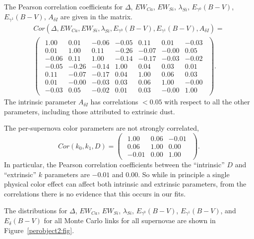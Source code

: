 \documentclass{aastex61}   	%
\begin{document}
The Pearson correlation coefficients for $\Delta$, $EW_{Ca}$, $EW_{Si}$, $\lambda_{Si}$, $E_{\gamma^0}(B-V)$, $E_{\gamma^1}(B-V)$,  $A_{\delta I}$ are given in the matrix.
\begin{multline}
Cor(\Delta, EW_{Ca}, EW_{Si}, \lambda_{Si}, E_{\gamma^0}(B-V), E_{\gamma^1}(B-V),  A_{\delta I}) =\\
\begin{pmatrix}
\begin{array}{rrrrrrr}
1.00 & 0.01 & -0.06 & -0.05 & 0.11 & 0.01 & -0.03 \\
0.01 & 1.00 & 0.11 & -0.26 & -0.07 & -0.00 & 0.05 \\
-0.06 & 0.11 & 1.00 & -0.14 & -0.17 & -0.03 & -0.02 \\
-0.05 & -0.26 & -0.14 & 1.00 & 0.04 & 0.03 & 0.01 \\
0.11 & -0.07 & -0.17 & 0.04 & 1.00 & 0.06 & 0.03 \\
0.01 & -0.00 & -0.03 & 0.03 & 0.06 & 1.00 & -0.00 \\
-0.03 & 0.05 & -0.02 & 0.01 & 0.03 & -0.00 & 1.00
\end{array}
\end{pmatrix}.
\end{multline}
The intrinsic parameter $A_{\delta I}$ has correlations $<0.05$ with respect to all the other parameters, including those attributed
to extrinsic dust.

\color{red}
The per-supernova color parameters are not strongly correlated,
\begin{equation}
Cor(k_0, k_1, D) =
\begin{pmatrix}
\begin{array}{rrr}
1.00 & 0.06 & -0.01 \\
0.06 & 1.00 & 0.00 \\
-0.01 & 0.00 & 1.00
\end{array}
\end{pmatrix}.
\end{equation}
In particular, the Pearson correlation coefficients between the ``intrinsic'' $D$ and ``extrinsic'' $k$ parameters are $-0.01$ and $0.00$.
So while in principle a single physical color effect can affect both intrinsic and extrinsic parameters, from the correlations
there is no evidence
that this occurs in our fits.


The distributions for $\Delta$, $EW_{Ca}$, $EW_{Si}$, $\lambda_{Si}$, $E_{\gamma^0}(B-V)$, 
$E_{\gamma^1}(B-V)$, and
$E_{\delta}(B-V)$ for all Monte Carlo links for all supernovae are shown in Figure~\ref{perobject2:fig}.
\end{document}
